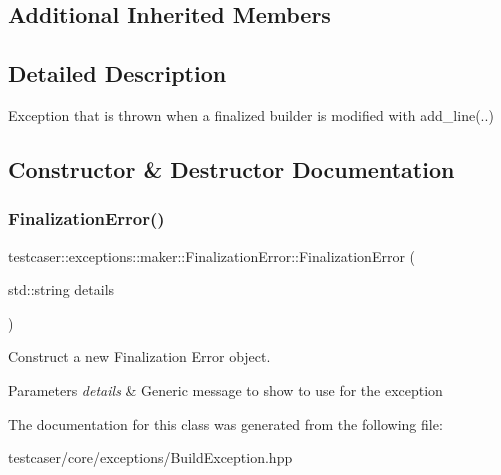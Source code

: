 \subsection*{Additional Inherited Members}


\subsection{Detailed Description}
Exception that is thrown when a finalized builder is modified with add\+\_\+line(..) 

\subsection{Constructor \& Destructor Documentation}
\mbox{\label{classtestcaser_1_1exceptions_1_1maker_1_1FinalizationError_a0f878eb50c25b123675bc01eb66fd3bd}} 
\subsubsection{\texorpdfstring{Finalization\+Error()}{FinalizationError()}}
{\footnotesize\ttfamily testcaser\+::exceptions\+::maker\+::\+Finalization\+Error\+::\+Finalization\+Error (\begin{DoxyParamCaption}\item[{std\+::string}]{details }\end{DoxyParamCaption})\hspace{0.3cm}{\ttfamily [inline]}}



Construct a new Finalization Error object. 


\begin{DoxyParams}{Parameters}
{\em details} & Generic message to show to use for the exception \\
\hline
\end{DoxyParams}


The documentation for this class was generated from the following file\+:\begin{DoxyCompactItemize}
\item 
testcaser/core/exceptions/Build\+Exception.\+hpp\end{DoxyCompactItemize}
